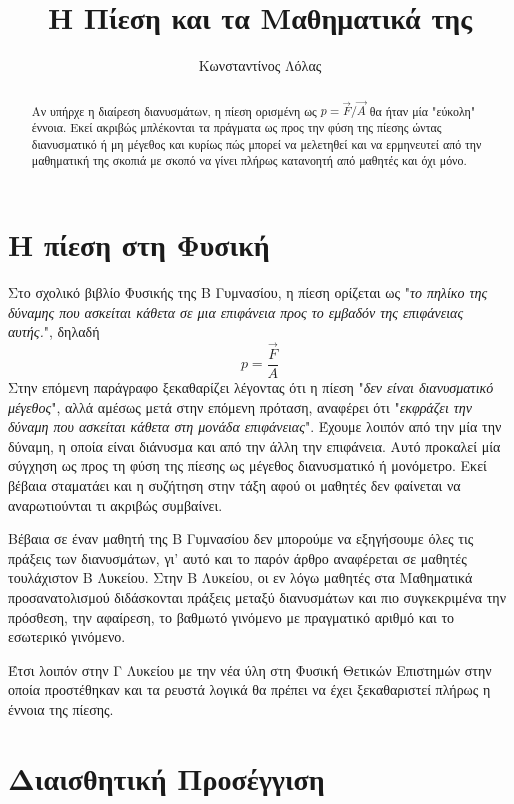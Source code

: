 \documentclass[12pt]{article}
\title{Η Πίεση και τα Μαθηματικά της}
\author{Κωνσταντίνος Λόλας}
\begin{document}
\maketitle
\begin{abstract}
  Αν υπήρχε η διαίρεση διανυσμάτων, η πίεση ορισμένη ως $p=\vec{F}/\vec{A}$ θα ήταν μία "εύκολη" έννοια. Εκεί ακριβώς μπλέκονται τα πράγματα ως προς την φύση της πίεσης ώντας διανυσματικό ή μη μέγεθος και κυρίως πώς μπορεί να μελετηθεί και να ερμηνευτεί από την μαθηματική της σκοπιά με σκοπό να γίνει πλήρως κατανοητή από μαθητές και όχι μόνο.
\end{abstract}

\newpage
\section{Η πίεση στη Φυσική}
Στο σχολικό βιβλίο Φυσικής της Β Γυμνασίου, η πίεση ορίζεται ως "\textit{το πηλίκο της δύναμης που ασκείται κάθετα σε μια επιφάνεια προς το εμβαδόν της επιφάνειας αυτής.}", δηλαδή
\begin{equation} \label{eq:1}
  p=\frac{\vec{F}}{A}
\end{equation}
Στην επόμενη παράγραφο ξεκαθαρίζει λέγοντας ότι η πίεση "\textit{δεν είναι διανυσματικό μέγεθος}", αλλά αμέσως μετά στην επόμενη πρόταση, αναφέρει ότι "\textit{εκφράζει την δύναμη που ασκείται κάθετα στη μονάδα επιφάνειας}". Έχουμε λοιπόν από την μία την δύναμη, η οποία είναι διάνυσμα και από την άλλη την επιφάνεια. Αυτό προκαλεί μία σύγχηση ως προς τη φύση της πίεσης ως μέγεθος διανυσματικό ή μονόμετρο. Εκεί βέβαια σταματάει και η συζήτηση στην τάξη αφού οι μαθητές δεν φαίνεται να αναρωτιούνται τι ακριβώς συμβαίνει.

Βέβαια σε έναν μαθητή της Β Γυμνασίου δεν μπορούμε να εξηγήσουμε όλες τις πράξεις των διανυσμάτων, γι' αυτό και το παρόν άρθρο αναφέρεται σε μαθητές τουλάχιστον Β Λυκείου. Στην Β Λυκείου, οι εν λόγω μαθητές στα Μαθηματικά προσανατολισμού διδάσκονται πράξεις μεταξύ διανυσμάτων και πιο συγκεκριμένα την πρόσθεση, την αφαίρεση, το βαθμωτό γινόμενο με πραγματικό αριθμό και το εσωτερικό γινόμενο.

Έτσι λοιπόν στην Γ Λυκείου με την νέα ύλη στη Φυσική Θετικών Επιστημών στην οποία προστέθηκαν και τα ρευστά λογικά θα πρέπει να έχει ξεκαθαριστεί πλήρως η έννοια της πίεσης.

\section{Διαισθητική Προσέγγιση}
\end{document}
